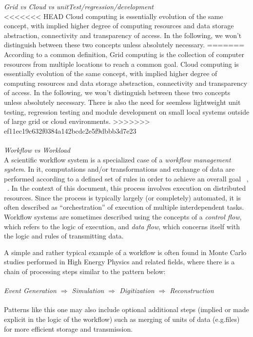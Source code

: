 \textit{Grid vs Cloud vs unitTest/regression/development}
\\
<<<<<<< HEAD
Cloud computing is essentially evolution of the same concept, with implied higher degree of computing resources and data storage abstraction, connectivity and transparency of access. In the following, we won't distinguish between these two concepts unless absolutely necessary.
=======
According to a common definition, Grid computing is the collection of computer resources from multiple locations to reach a common goal. Cloud computing is essentially evolution of the same concept, with implied higher degree of computing resources and data storage abstraction, connectivity and transparency of access. In the following, we won't distinguish between these two concepts unless absolutely necessary.  There is also the need for seemless lightweight unit testing, regression testing and module development on small local systems outside of large grid or cloud environments.
>>>>>>> ef11ec19c632f0384a142bcdc2e5f9dbbb3d7e23
\\
\\
\textit{Workflow vs Workload}
\\
A scientific workflow system is a specialized case of a \textit{workflow management system}. In it, computations and/or transformations and exchange of data are performed according to a defined set of rules in order to achieve an overall goal ~\cite{grid_workflow_taxonomy}, ~\cite{grid_workflow_fit}. In the context of this document, this process involves execution on distributed resources. Since the process is typically largely (or completely) automated, it is often described as ``orchestration'' of execution of multiple interdependent tasks. Workflow systems are sometimes described using the concepts of a \textit{control flow}, which refers to the logic of execution, and \textit{data flow}, which concerns itself with the logic and rules of transmitting data.

A simple and rather typical example of a workflow is often found in Monte Carlo studies performed in High Energy Physics and related fields, where there is a chain of processing steps similar to the pattern below:
\\
\\
\textit{Event  Generation $\Longrightarrow$ Simulation $\Longrightarrow$ Digitization $\Longrightarrow$ Reconstruction}
\\
\\
Patterns like this one may also include optional additional steps (implied or made explicit in the logic of the workflow) such as merging of units of data (e.g.files) for more efficient storage and transmission.

